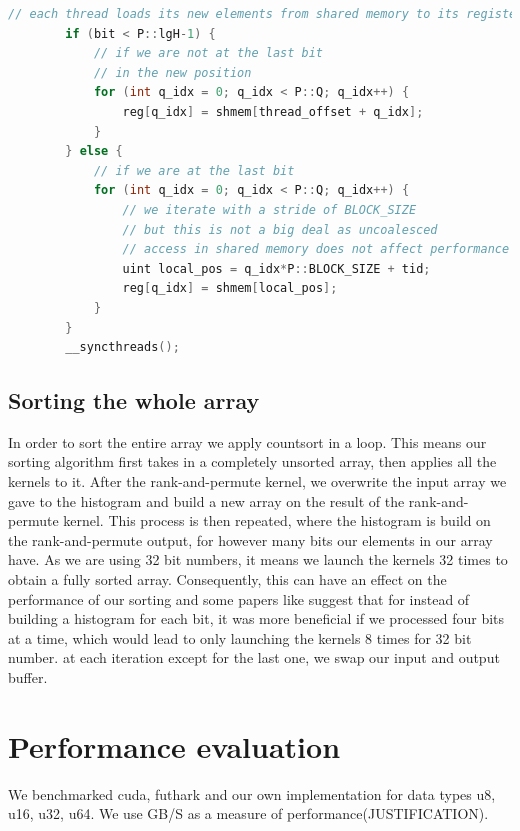 \documentclass{article}
\begin{document}
\begin{lstlisting}[language=c++]
        // each thread loads its new elements from shared memory to its registers
        if (bit < P::lgH-1) {
            // if we are not at the last bit
            // in the new position
            for (int q_idx = 0; q_idx < P::Q; q_idx++) {
                reg[q_idx] = shmem[thread_offset + q_idx];
            }
        } else {
            // if we are at the last bit
            for (int q_idx = 0; q_idx < P::Q; q_idx++) {
                // we iterate with a stride of BLOCK_SIZE
                // but this is not a big deal as uncoalesced 
                // access in shared memory does not affect performance
                uint local_pos = q_idx*P::BLOCK_SIZE + tid;
                reg[q_idx] = shmem[local_pos];
            }
        }
        __syncthreads();
\end{lstlisting}


\subsection{Sorting the whole array}


In order to sort the entire array we apply countsort in a loop. 
This means our sorting algorithm first takes in a completely unsorted array, then applies all the kernels to it. 
After the rank-and-permute kernel, we overwrite the input array we gave to the histogram and build a new array on the result of the rank-and-permute kernel. 
This process is then repeated, where the histogram is build on the rank-and-permute output, for however many bits our elements in our array have. 
As we are using 32 bit numbers, it means we launch the kernels 32 times to obtain a fully sorted array. 
Consequently, this can have an effect on the performance of our sorting and some papers like \cite{satish} suggest that for instead of building a histogram for each bit, it was more beneficial if we processed four bits at a time, which would lead to only launching the kernels 8 times for 32 bit number. 
at each iteration except for the last one, we swap our input and output buffer.


\section{Performance evaluation}
We benchmarked cuda, futhark and our own implementation for data types u8, u16, u32, u64.
We use GB/S as a measure of performance(JUSTIFICATION).
\end{document}
